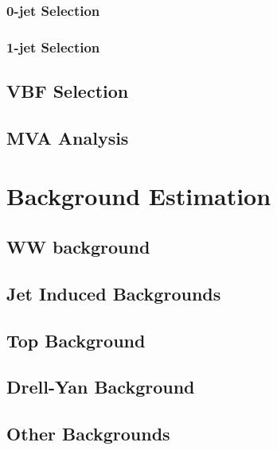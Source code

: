 \documentclass{cmspaper}
\begin{document}
    \subsubsection{0-jet Selection}
      \label{sec:sel_zerojet}
      
    \subsubsection{1-jet Selection}
      \label{sec:sel_onejet}
%      
    \subsection{VBF Selection}
      \label{sec:sel_vbf}
      
%    
  \subsection{MVA Analysis}
    \label{sec:anal_mva}
%    
%    

\section{Background Estimation}
    \label{sec:backgrounds}
    
    \label{sec:bkg_intro}
  \subsection{WW background}
    \label{sec:bkg_ww}
    
  \subsection{Jet Induced Backgrounds}
    \label{sec:bkg_fakes}
    
  \subsection{Top Background}
    \label{sec:bkg_top}
    
  \subsection{Drell-Yan Background}
    \label{sec:bkg_dy}
    
  \subsection{Other Backgrounds}
    \label{sec:bkg_other}
    
\end{document}
